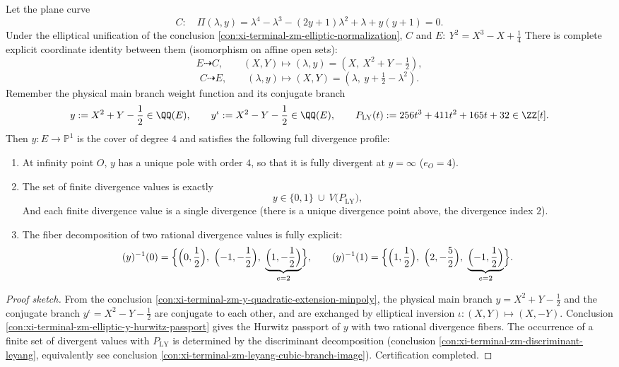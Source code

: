 \begin{conclusion}\label{con:xi-terminal-zm-elliptic-normalization-y-iota-ramification-portrait}
Let the plane curve
\[
C:\quad \Pi(\lambda,y)=\lambda^{4}-\lambda^{3}-(2y+1)\lambda^{2}+\lambda+y(y+1)=0.
\]
Under the elliptical unification of the conclusion \ref{con:xi-terminal-zm-elliptic-normalization}, \(C\) and
\(
E:\ Y^{2}=X^{3}-X+\tfrac14
\)
There is complete explicit coordinate identity between them (isomorphism on affine open sets):
\[
E\dashrightarrow C,\qquad (X,Y)\longmapsto (\lambda,y)=(X,\ X^{2}+Y-\tfrac12),
\]
\[
C\dashrightarrow E,\qquad (\lambda,y)\longmapsto (X,Y)=(\lambda,\ y+\tfrac12-\lambda^{2}).
\]
Remember the physical main branch weight function and its conjugate branch
\[
y:=X^{2}+Y-\frac12\in\QQ(E),
\qquad
y^{\iota}:=X^{2}-Y-\frac12\in\QQ(E),
\qquad
P_{\mathrm{LY}}(t):=256t^{3}+411t^{2}+165t+32\in\ZZ[t].
\]
Then \(y:E\to\mathbb P^{1}\) is the cover of degree \(4\) and satisfies the following full divergence profile:
\begin{enumerate}
\item At infinity point \(O\), \(y\) has a unique pole with order \(4\), so that it is fully divergent at \(y=\infty\) (\(e_{O}=4\)).
\item The set of finite divergence values ​​is exactly
  \[
  y\in\{0,1\}\ \cup\ V\!\bigl(P_{\mathrm{LY}}\bigr),
  \]
And each finite divergence value is a single divergence (there is a unique divergence point above, the divergence index \(2\)).
\item The fiber decomposition of two rational divergence values ​​is fully explicit:
  \[
  (y)^{-1}(0)=\Bigl\{\Bigl(0,\frac12\Bigr),\ \Bigl(-1,-\frac12\Bigr),\ \underbrace{\Bigl(1,-\frac12\Bigr)}_{e=2}\Bigr\},
  \qquad
  (y)^{-1}(1)=\Bigl\{\Bigl(1,\frac12\Bigr),\ \Bigl(2,-\frac52\Bigr),\ \underbrace{\Bigl(-1,\frac12\Bigr)}_{e=2}\Bigr\}.
  \]
\end{enumerate}
\end{conclusion}
\begin{proof}[Proof sketch]
From the conclusion \ref{con:xi-terminal-zm-y-quadratic-extension-minpoly}, the physical main branch \(y=X^{2}+Y-\tfrac12\) and the conjugate branch \(y^{\iota}=X^{2}-Y-\tfrac12\) are conjugate to each other, and are exchanged by elliptical inversion \(\iota:(X,Y)\mapsto(X,-Y)\).
Conclusion \ref{con:xi-terminal-zm-elliptic-y-hurwitz-passport} gives the Hurwitz passport of \(y\) with two rational divergence fibers.
The occurrence of a finite set of divergent values ​​with \(P_{\mathrm{LY}}\) is determined by the discriminant decomposition (conclusion \ref{con:xi-terminal-zm-discriminant-leyang}, equivalently see conclusion \ref{con:xi-terminal-zm-leyang-cubic-branch-image}). Certification completed.
\end{proof}

